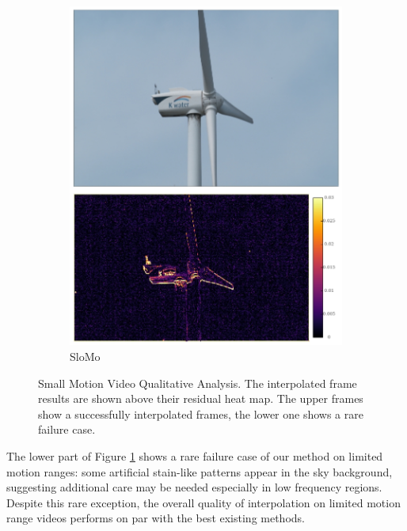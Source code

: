 \documentclass{article}
\begin{document}
\begin{figure}[h]
\begin{subfigure}{0.14\textwidth}
    \includegraphics[width=1\linewidth]{qua_imgs/TEST02_045_f0465_super.jpg}
    \caption{SloMo}
\end{subfigure}
\caption{
Small Motion Video Qualitative Analysis.
The interpolated frame results are shown above their residual heat map.
The upper frames show a successfully interpolated frames,
the lower one shows a rare failure case.}
\label{fig_small}
\end{figure}

The lower part of Figure \ref{fig_small} shows a rare failure case of our method on limited motion ranges:
some artificial stain-like patterns appear in the sky background,
suggesting additional care may be needed especially in low frequency regions.
Despite this rare exception, the overall quality of interpolation
on limited motion range videos performs on par with the best existing methods.
\end{document}
